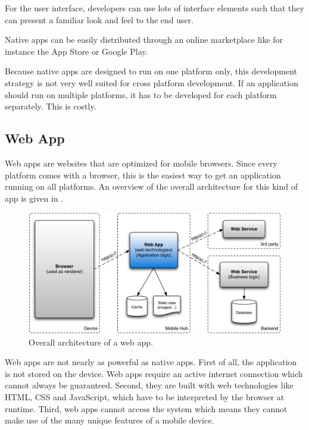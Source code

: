 \npar For the user interface, developers can use lots of interface elements such that they can present a familiar look and feel to the end user. 

\npar Native apps can be easily distributed through an online marketplace like for instance the App Store or Google Play. 

\npar Because native apps are designed to run on one platform only, this development strategy is not very well suited for cross platform development. If an application should run on multiple platforms, it has to be developed for each platform separately. This is costly.


\subsection{Web App}

\npar Web apps are websites that are optimized for mobile browsers. Since every platform comes with a browser, this is the easiest way to get an application running on all platforms. An overview of the overall architecture for this kind of app is given in .

\begin{figure}[h!]
    \begin{center}
        \includegraphics[width=\textwidth]{figs/web.pdf}
        \caption{
            Overall architecture of a web app.
        }
        \label{fig:web}
    \end{center}
\end{figure}

\npar Web apps are not nearly as powerful as native apps. First of all, the application is not stored on the device. Web apps require an active internet connection which cannot always be guaranteed. Second, they are built with web technologies like HTML, CSS and JavaScript, which have to be interpreted by the browser at runtime. Third, web apps cannot access the system which means they cannot make use of the many unique features of a mobile device. 

